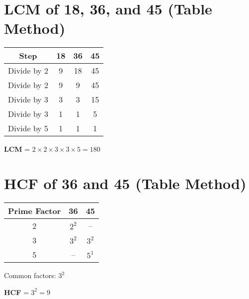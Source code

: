 \documentclass{article}
\begin{document}
\section*{LCM of 18, 36, and 45 (Table Method)}

\begin{tabular}{|c|c|c|c|}
\hline
\textbf{Step} & 18 & 36 & 45 \\
\hline
Divide by 2 & 9 & 18 & 45 \\
\hline
Divide by 2 & 9 & 9 & 45 \\
\hline
Divide by 3 & 3 & 3 & 15 \\
\hline
Divide by 3 & 1 & 1 & 5 \\
\hline
Divide by 5 & 1 & 1 & 1 \\
\hline
\end{tabular}

\vspace{0.5cm}

\noindent
\textbf{LCM} = \( 2 \times 2 \times 3 \times 3 \times 5 = 180 \)

\vspace{1cm}

\section*{HCF of 36 and 45 (Table Method)}

\begin{tabular}{|c|c|c|}
\hline
\textbf{Prime Factor} & 36 & 45 \\
\hline
2 & $2^2$ & -- \\
\hline
3 & $3^2$ & $3^2$ \\
\hline
5 & -- & $5^1$ \\
\hline
\end{tabular}

\vspace{0.5cm}

\noindent
Common factors: \( 3^2 \)

\noindent
\textbf{HCF} = \( 3^2 = 9 \)
\end{document}
